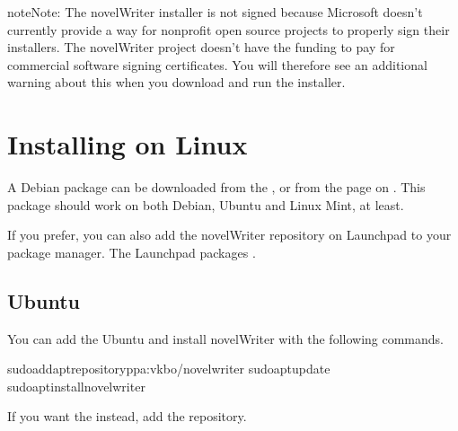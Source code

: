 \documentclass[a4paper,11pt,english]{sphinxmanual}
\begin{document}
\begin{sphinxadmonition}{note}{Note:}
\sphinxAtStartPar
The novelWriter installer is not signed because Microsoft doesn’t currently provide a way for
non\sphinxhyphen{}profit open source projects to properly sign their installers. The novelWriter project
doesn’t have the funding to pay for commercial software signing certificates. You will therefore
see an additional warning about this when you download and run the installer.
\end{sphinxadmonition}


\section{Installing on Linux}
\label{\detokenize{int_started:installing-on-linux}}\label{\detokenize{int_started:a-started-linux}}
\sphinxAtStartPar
A Debian package can be downloaded from the , or from the  page on
. This package should work on both Debian, Ubuntu and Linux Mint, at least.

\sphinxAtStartPar
If you prefer, you can also add the novelWriter repository on Launchpad to your package manager.
The Launchpad packages .


\subsection{Ubuntu}
\label{\detokenize{int_started:ubuntu}}
\sphinxAtStartPar
You can add the Ubuntu  and install novelWriter with the following commands.

\begin{sphinxVerbatim}[commandchars=\\\{\}]
sudoadd\PYGZhy{}apt\PYGZhy{}repositoryppa:vkbo/novelwriter
sudoaptupdate
sudoaptinstallnovelwriter
\end{sphinxVerbatim}

\sphinxAtStartPar
If you want the  instead, add the  repository.
\end{document}
